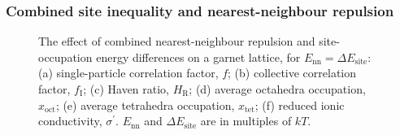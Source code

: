 \documentclass[aps,prb,twocolumn,superscriptaddress,reprint]{revtex4-1}
\newcommand{\m}[1]{\mathrm{#1}}
\begin{document}
\subsubsection{Combined site inequality and nearest-neighbour repulsion}

\begin{figure}[tb]
  \centering
    \caption{\label{fig:both_energies_data}The effect of combined nearest-neighbour repulsion and site-occupation energy differences on a garnet lattice, for $E_\m{nn}=\Delta E_\m{site}$: (a) single-particle correlation factor, $f$; (b) collective correlation factor, $f_\m{I}$; (c) Haven ratio, $H_\m{R}$; (d) average octahedra occupation, $x_\m{oct}$; (e) average tetrahedra occupation, $x_\m{tet}$; (f) reduced ionic conductivity, $\sigma^\prime$. $E_\m{nn}$ and $\Delta E_\m{site}$ are in multiples of $kT$.}
\end{figure}
\end{document}
